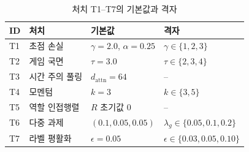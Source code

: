 \begin{table}[htbp]
  \centering
  \caption{처치 T1--T7의 기본값과 격자}
  \label{tab:app-treatments}
  \small
  \begin{tabular}{@{}llll@{}}
    \toprule
    ID & 처치 & 기본값 & 격자 \\
    \midrule
    T1 & 초점 손실 & $\gamma = 2.0$, $\alpha = 0.25$ & $\gamma \in \{1, 2, 3\}$ \\
    T2 & 게임 국면 & $\tau = 3.0$ & $\tau \in \{2, 3, 4\}$ \\
    T3 & 시간 주의 풀링 & $d_{\mathrm{attn}} = 64$ & -- \\
    T4 & 모멘텀 & $k = 3$ & $k \in \{3, 5\}$ \\
    T5 & 역할 인접행렬 & $R$ 초기값 0 & -- \\
    T6 & 다중 과제 & $(0.1, 0.05, 0.05)$ & $\lambda_g \in \{0.05, 0.1, 0.2\}$ \\
    T7 & 라벨 평활화 & $\epsilon = 0.05$ & $\epsilon \in \{0.03, 0.05, 0.10\}$ \\
    \bottomrule
  \end{tabular}
\end{table}
